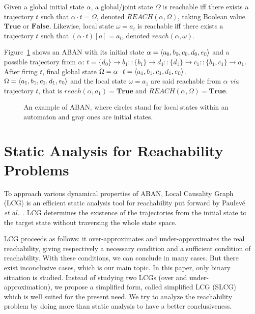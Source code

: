 \documentclass[runningheads]{llncs}
\newcommand{\acm}[3]{\{#1\}\rightarrow#3}
\DeclarePairedDelimiter{\init}{\langle}{\rangle}
\begin{document}
\begin{definition}[Reachability]
Given a global initial state $\alpha$, a global/joint state $\Omega$ is reachable iff there exists a trajectory $t$ such that $\alpha\cdot t=\Omega$, denoted $REACH(\alpha, \Omega)$, taking Boolean value $\mathbf{True}$ or $\mathbf{False}$.
Likewise, local state $\omega=a_i$ is reachable iff there exists a trajectory $t$ such that $(\alpha\cdot t)[a]=a_i$, denoted $reach(\alpha, \omega)$.
\end{definition}
\begin{example}\label{example:aban}
Figure~\ref{fig:1} shows an ABAN with its initial state $\alpha=\init{ a_0,b_0,c_0,d_0,e_0}$ and a possible trajectory from $\alpha$: $t=\acm{d_0}{b_0}{b_1}::\acm{b_1}{d_0}{d_1}::\acm{d_1}{c_0}{c_1}::\acm{b_1,c_1}{a_0}{a_1}$. After firing $t$, final global state $\Omega=\alpha\cdot t=\init{a_1,b_1,c_1,d_1,e_0}$.
$\Omega=\init{ a_1,b_1,c_1,d_1,e_0}$ and the local state $\omega=a_1$ are said reachable from $\alpha$ \textit{via} trajectory $t$, that is $reach(\alpha,a_1)=\mathbf{True}$ and $REACH(\alpha,\Omega)=\mathbf{True}$.
\end{example}
\begin{figure}[ht]
\centering

\caption{An example of ABAN, where circles stand for local states within an automaton and gray ones are initial states.}\label{fig:1}
\end{figure}	

\section{Static Analysis for Reachability Problems}\label{sect:3}
To approach various dynamical properties of ABAN, Local Causality Graph (LCG) is an efficient static analysis tool for reachability put forward by Paulev\'e \textit{et al.}~\cite{pauleve2011}. 
LCG determines the existence of the trajectories from the initial state to the target state without traversing the whole state space.

LCG proceeds as follows: it over-approximates and under-approximates the real reachability, giving respectively a necessary condition and a sufficient condition of reachability. 
With these conditions, we can conclude in many cases.
But there exist inconclusive cases, which is our main topic.
In this paper, only binary situation is studied.
Instead of studying two LCGs (over and under-approximation), we propose a simplified form, called simplified LCG (SLCG) which is well suited for the present need.
We try to analyze the reachability problem by doing more than static analysis to have a better conclusiveness.
\end{document}
